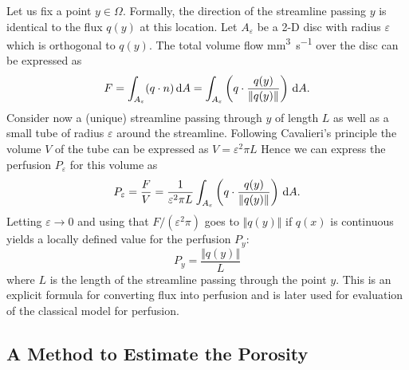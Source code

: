 \documentclass[paper=a4, fontsize=11pt,parskip=half,headings=small]{scrartcl}
\newcommand{\siqt}{\milli\meter\cubed\per\second}
\begin{document}
	Let us fix a point $y \in \Omega$.
	Formally, the direction of the streamline passing $y$ is identical to the flux $q(y)$ at this location. 
	Let $A_\varepsilon$ be a 2-D disc with radius $\varepsilon$ which is orthogonal to $q(y)$.
	The total volume flow \si{\siqt} over the disc can be expressed as
	\[
		F = \int_{A_\varepsilon} (q \cdot n) \,\mathrm{d} A = \int_{A_\varepsilon} \left(q\cdot \frac{q(y)}{\Vert q(y) \Vert}\right) \,\mathrm{d} A.
	\]
	Consider now a (unique) streamline passing through $y$ of length $L$ as well as a small tube of radius $\varepsilon$ around the streamline.
	Following Cavalieri's principle the volume $V$ of the tube can be expressed as $V = \varepsilon^2\pi L$
	Hence we can express the perfusion $P_\varepsilon$ for this volume as
	\[
		P_\varepsilon = \frac{F}{V} = \frac{1}{\varepsilon^2 \pi L} \int_{A_\varepsilon} \left( q\cdot \frac{q(y)}{\Vert q(y) \Vert} \right) \,\mathrm{d} A. 
	\]
	Letting $\varepsilon \to 0$ and using that $F/(\varepsilon^2\pi)$ goes to $\Vert q(y) \Vert$ if $q(x)$ is continuous yields a locally defined value for the perfusion $P_{y}$:
	\begin{equation}
		P_{y} = \frac{\Vert q(y) \Vert}{L}
		\label{eq:flux2perf}
	\end{equation}
	where $L$ is the length of the streamline passing through the point $y$. 
	This is an explicit formula for converting flux into perfusion and is later used for evaluation of the classical model for perfusion. 
	
	
	


	\subsection{A Method to Estimate the Porosity}\label{sec:CBV}
	
\end{document}

